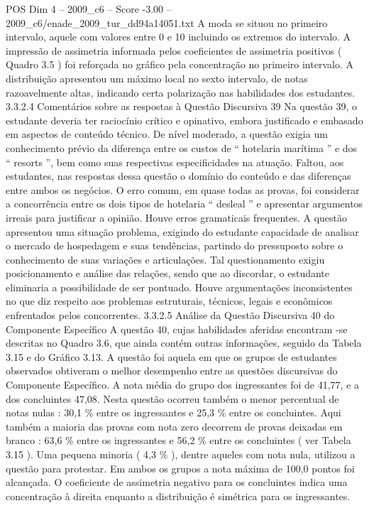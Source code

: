 \begin{textsample}{POS Dim 4 – 2009\_c6 – Score -3.00 – 2009\_c6/enade\_2009\_tur\_dd94a14051.txt}
A moda se situou no primeiro intervalo, aquele com valores entre 0 e 10 incluindo os extremos do intervalo.
A impressão de assimetria informada pelos coeficientes de assimetria positivos ( Quadro 3.5 ) foi reforçada no gráfico pela concentração no primeiro intervalo.
A distribuição apresentou um máximo local no sexto intervalo, de notas razoavelmente altas, indicando certa polarização nas habilidades dos estudantes. 3.3.2.4 Comentários sobre as respostas à Questão Discursiva 39 Na questão 39, o estudante deveria ter raciocínio crítico e opinativo, embora justificado e embasado em aspectos de conteúdo técnico.
De nível moderado, a questão exigia um conhecimento prévio da diferença entre os custos de “ hotelaria marítima ” e dos “ resorts ”, bem como suas respectivas especificidades na atuação.
Faltou, aos estudantes, nas respostas dessa questão o domínio do conteúdo e das diferenças entre ambos os negócios.
O erro comum, em quase todas as provas, foi considerar a concorrência entre os dois tipos de hotelaria “ desleal ” e apresentar argumentos irreais para justificar a opinião.
Houve erros gramaticais frequentes.
A questão apresentou uma situação problema, exigindo do estudante capacidade de analisar o mercado de hospedagem e suas tendências, partindo do pressuposto sobre o conhecimento de suas variações e articulações.
Tal questionamento exigiu posicionamento e análise das relações, sendo que ao discordar, o estudante eliminaria a possibilidade de ser pontuado.
Houve argumentações inconsistentes no que diz respeito aos problemas estruturais, técnicos, legais e econômicos enfrentados pelos concorrentes. 3.3.2.5 Análise da Questão Discursiva 40 do Componente Específico A questão 40, cujas habilidades aferidas encontram -se descritas no Quadro 3.6, que ainda contém outras informações, seguido da Tabela 3.15 e do Gráfico 3.13.
A questão foi aquela em que os grupos de estudantes observados obtiveram o melhor desempenho entre as questões discursivas do Componente Específico.
A nota média do grupo dos ingressantes foi de 41,77, e a dos concluintes 47,08.
Nesta questão ocorreu também o menor percentual de notas nulas : 30,1 \% entre os ingressantes e 25,3 \% entre os concluintes.
Aqui também a maioria das provas com nota zero decorrem de provas deixadas em branco : 63,6 \% entre os ingressantes e 56,2 \% entre os concluintes ( ver Tabela 3.15 ).
Uma pequena minoria ( 4,3 \% ), dentre aqueles com nota nula, utilizou a questão para protestar.
Em ambos os grupos a nota máxima de 100,0 pontos foi alcançada.
O coeficiente de assimetria negativo para os concluintes indica uma concentração à direita enquanto a distribuição é simétrica para os ingressantes.

\end{textsample}
